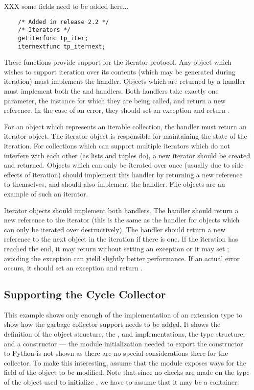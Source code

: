 XXX some fields need to be added here...


\begin{verbatim}
    /* Added in release 2.2 */
    /* Iterators */
    getiterfunc tp_iter;
    iternextfunc tp_iternext;
\end{verbatim}

These functions provide support for the iterator protocol.  Any object
which wishes to support iteration over its contents (which may be
generated during iteration) must implement the 
handler.  Objects which are returned by a  handler must
implement both the  and  handlers.
Both handlers take exactly one parameter, the instance for which they
are being called, and return a new reference.  In the case of an
error, they should set an exception and return \NULL.

For an object which represents an iterable collection, the
 handler must return an iterator object.  The iterator
object is responsible for maintaining the state of the iteration.  For
collections which can support multiple iterators which do not
interfere with each other (as lists and tuples do), a new iterator
should be created and returned.  Objects which can only be iterated
over once (usually due to side effects of iteration) should implement
this handler by returning a new reference to themselves, and should
also implement the  handler.  File objects are an
example of such an iterator.

Iterator objects should implement both handlers.  The 
handler should return a new reference to the iterator (this is the
same as the  handler for objects which can only be
iterated over destructively).  The  handler should
return a new reference to the next object in the iteration if there is
one.  If the iteration has reached the end, it may return \NULL{}
without setting an exception or it may set ;
avoiding the exception can yield slightly better performance.  If an
actual error occurs, it should set an exception and return \NULL.


\subsection{Supporting the Cycle Collector
            \label{example-cycle-support}}

This example shows only enough of the implementation of an extension
type to show how the garbage collector support needs to be added.  It
shows the definition of the object structure, the
,  and 
implementations, the type structure, and a constructor --- the module
initialization needed to export the constructor to Python is not shown
as there are no special considerations there for the collector.  To
make this interesting, assume that the module exposes ways for the
 field of the object to be modified.  Note that
since no checks are made on the type of the object used to initialize
, we have to assume that it may be a container.


